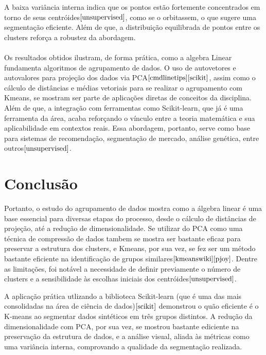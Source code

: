 \documentclass[a4paper,12pt]{article}
\begin{document}
A baixa variância interna indica que os pontos estão fortemente concentrados em torno de seus centróides$\cite{unsupervised}$, como se o orbitassem, o que sugere uma segmentação eficiente. Além de que, a distribuição equilibrada de pontos entre os clusters reforça a robustez da abordagem.
\\
\\
   Os resultados obtidos ilustram, de forma prática, como a algebra Linear fundamenta algoritmos de agrupamento de dados. O uso de autovetores e autovalores para projeção dos dados via PCA$\cite{cmdlinetips}\cite{scikit}$, assim como o cálculo de distâncias e médias vetoriais para se realizar o agrupamento com Kmeans, se mostram ser parte de aplicações diretas de conceitos da disciplina.
Além de que, a integração com ferramentas como Scikit-learn, que já é uma ferramenta da área, acaba reforçando o vínculo entre a teoria matemática e sua aplicabilidade em contextos reais. Essa abordagem, portanto, serve como base para sistemas de recomendação, segmentação de mercado, análise genética, entre outros$\cite{unsupervised}$.

\section{Conclusão}

Portanto, o estudo do agrupamento de dados mostra como a álgebra linear é uma base essencial para diversas etapas do processo, desde o cálculo de distâncias de projeção, até a redução de dimensionalidade. Se utilizar do PCA como uma técnica de compressão de dados tambem se mostra ser bastante eficaz para preservar a estrutura dos clusters, e Kmeans, por sua vez, se fez ser um método bastante eficiente na identificação de grupos similares$\cite{kmeanswiki}\cite{pjoy}$. Dentre as limitações, foi notável a necessidade de definir previamente o número de clusters e a sensibilidade às escolhas iniciais dos centróides$\cite{unsupervised}$.


A aplicação prática utlizando a biblioteca Scikit-learn (que é uma das mais consolidadas na área de ciência de dados)$\cite{scikit}$ demonstrou o quão eficiente é o K-means ao segmentar dados sintéticos em três grupos distintos. A redução  da dimensionalidade com PCA, por sua vez, se mostrou bastante ediciente na preservação da estrutura de dados, e a análise visual, aliada às métricas como uma variância interna, comprovando a qualidade da segmentação realizada.
\end{document}
